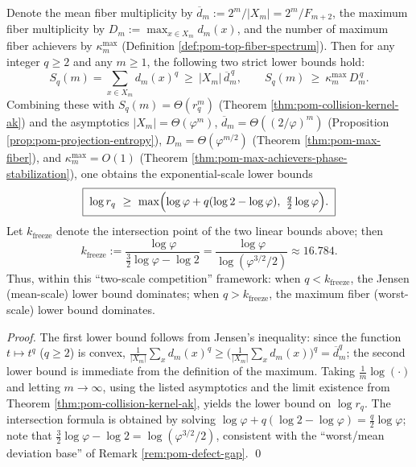 \begin{proposition}\label{prop:pom-freeze-threshold}
Denote the mean fiber multiplicity by
\(
\overline d_m:=2^m/|X_m|=2^m/F_{m+2}
\),
the maximum fiber multiplicity by
\(
D_m:=\max_{x\in X_m}d_m(x)
\),
and the number of maximum fiber achievers by \(\kappa_m^{\mathrm{max}}\) (Definition \ref{def:pom-top-fiber-spectrum}).
Then for any integer \(q\ge 2\) and any \(m\ge 1\), the following two strict lower bounds hold:
\[
S_q(m)=\sum_{x\in X_m}d_m(x)^q\ \ge\ |X_m|\,\overline d_m^{\,q},
\qquad
S_q(m)\ \ge\ \kappa_m^{\mathrm{max}}\,D_m^{\,q}.
\]
Combining these with \(S_q(m)=\Theta(r_q^m)\) (Theorem \ref{thm:pom-collision-kernel-ak}) and the asymptotics
\(|X_m|=\Theta(\varphi^m)\), \(\overline d_m=\Theta((2/\varphi)^m)\) (Proposition \ref{prop:pom-projection-entropy}),
\(D_m=\Theta(\varphi^{m/2})\) (Theorem \ref{thm:pom-max-fiber}), and \(\kappa_m^{\mathrm{max}}=O(1)\) (Theorem \ref{thm:pom-max-achievers-phase-stabilization}), one obtains the exponential-scale lower bounds
\[
\boxed{\;
\log r_q\ \ge\ \max\Bigl(\log\varphi+q(\log 2-\log\varphi),\ \tfrac{q}{2}\log\varphi\Bigr).\;}
\]
Let \(k_{\mathrm{freeze}}\) denote the intersection point of the two linear bounds above; then
\[
\boxed{\;
k_{\mathrm{freeze}}
:=\frac{\log\varphi}{\tfrac32\log\varphi-\log 2}
=\frac{\log\varphi}{\log(\varphi^{3/2}/2)}
\approx 16.784. \;}
\]
Thus, within this ``two-scale competition'' framework: when \(q<k_{\mathrm{freeze}}\), the Jensen (mean-scale) lower bound dominates; when \(q>k_{\mathrm{freeze}}\), the maximum fiber (worst-scale) lower bound dominates.
\end{proposition}
\begin{proof}
The first lower bound follows from Jensen's inequality: since the function \(t\mapsto t^q\) (\(q\ge 2\)) is convex,
\(
\frac1{|X_m|}\sum_x d_m(x)^q\ge \bigl(\frac1{|X_m|}\sum_x d_m(x)\bigr)^q=\overline d_m^q
\);
the second lower bound is immediate from the definition of the maximum.
Taking \(\frac1m\log(\cdot)\) and letting \(m\to\infty\), using the listed asymptotics and the limit existence from Theorem \ref{thm:pom-collision-kernel-ak}, yields the lower bound on \(\log r_q\).
The intersection formula is obtained by solving
\(
\log\varphi+q(\log 2-\log\varphi)=\frac{q}{2}\log\varphi
\);
note that \(\tfrac32\log\varphi-\log2=\log(\varphi^{3/2}/2)\), consistent with the ``worst/mean deviation base'' of Remark \ref{rem:pom-defect-gap}. \qed
\end{proof}

